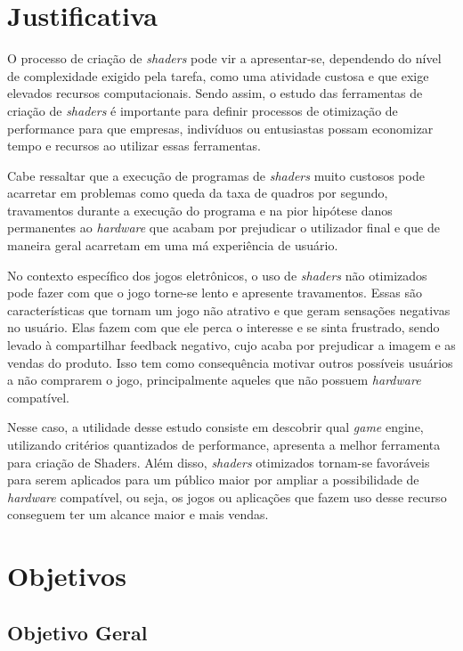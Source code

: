 \section{Justificativa}
\label{sec:justificativa}

O processo de criação de \textit{shaders} pode vir a apresentar-se, dependendo do nível de complexidade exigido pela tarefa, como uma atividade custosa e que exige elevados recursos computacionais. Sendo assim, o estudo das ferramentas de criação de \textit{shaders} é importante para definir processos de otimização de performance para que empresas, indivíduos ou entusiastas possam economizar tempo e recursos ao utilizar essas ferramentas. 

Cabe ressaltar que a execução de programas de \textit{shaders} muito custosos pode acarretar em problemas como queda da taxa de quadros por segundo, travamentos durante a execução do programa e na pior hipótese danos permanentes ao \textit{hardware} que acabam por prejudicar o utilizador final e que de maneira geral acarretam em uma má experiência de usuário. 

No contexto específico dos jogos eletrônicos, o uso de \textit{shaders} não otimizados pode fazer com que o jogo torne-se lento e apresente travamentos. Essas são características que tornam um jogo não atrativo e que geram sensações negativas no usuário. Elas fazem com que ele perca o interesse e se sinta frustrado, sendo levado à compartilhar feedback negativo, cujo acaba por prejudicar a imagem e as vendas do produto. Isso tem como consequência motivar outros possíveis usuários a não comprarem o jogo, principalmente aqueles que não possuem \textit{hardware} compatível.

Nesse caso, a utilidade desse estudo consiste em descobrir qual \textit{game} engine, utilizando critérios quantizados de performance, apresenta a melhor ferramenta para criação de Shaders. Além disso, \textit{shaders} otimizados tornam-se favoráveis para serem aplicados para um público maior por ampliar a possibilidade de \textit{hardware} compatível, ou seja, os jogos ou aplicações que fazem uso desse recurso conseguem ter um alcance maior e mais vendas.

\section{Objetivos}
\label{sec:objetivos}

\subsection{Objetivo Geral}
\label{sec:objetivo-geral}

